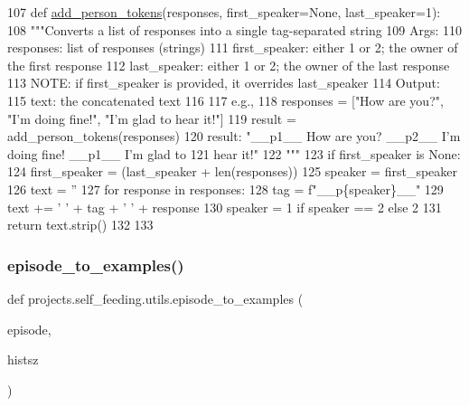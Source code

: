 \begin{DoxyCode}
107 \textcolor{keyword}{def }\hyperlink{namespaceprojects_1_1self__feeding_1_1utils_a3f3d055dc6c4058057baae7b240de5ec}{add\_person\_tokens}(responses, first\_speaker=None, last\_speaker=1):
108     \textcolor{stringliteral}{"""Converts a list of responses into a single tag-separated string}
109 \textcolor{stringliteral}{    Args:}
110 \textcolor{stringliteral}{        responses: list of responses (strings)}
111 \textcolor{stringliteral}{        first\_speaker: either 1 or 2; the owner of the first response}
112 \textcolor{stringliteral}{        last\_speaker: either 1 or 2; the owner of the last response}
113 \textcolor{stringliteral}{            NOTE: if first\_speaker is provided, it overrides last\_speaker}
114 \textcolor{stringliteral}{    Output:}
115 \textcolor{stringliteral}{        text: the concatenated text}
116 \textcolor{stringliteral}{}
117 \textcolor{stringliteral}{    e.g.,}
118 \textcolor{stringliteral}{    responses = ["How are you?", "I'm doing fine!", "I'm glad to hear it!"]}
119 \textcolor{stringliteral}{    result = add\_person\_tokens(responses)}
120 \textcolor{stringliteral}{    result: "\_\_p1\_\_ How are you? \_\_p2\_\_ I'm doing fine! \_\_p1\_\_ I'm glad to}
121 \textcolor{stringliteral}{        hear it!"}
122 \textcolor{stringliteral}{    """}
123     \textcolor{keywordflow}{if} first\_speaker \textcolor{keywordflow}{is} \textcolor{keywordtype}{None}:
124         first\_speaker = (last\_speaker + len(responses)) %
125     speaker = first\_speaker
126     text = \textcolor{stringliteral}{''}
127     \textcolor{keywordflow}{for} response \textcolor{keywordflow}{in} responses:
128         tag = f\textcolor{stringliteral}{"\_\_p\{speaker\}\_\_"}
129         text += \textcolor{stringliteral}{' '} + tag + \textcolor{stringliteral}{' '} + response
130         speaker = 1 \textcolor{keywordflow}{if} speaker == 2 \textcolor{keywordflow}{else} 2
131     \textcolor{keywordflow}{return} text.strip()
132 
133 
\end{DoxyCode}
\mbox{\label{namespaceprojects_1_1self__feeding_1_1utils_a4523d4a7c4da698dda134e32acebe320}} 
\subsubsection{\texorpdfstring{episode\+\_\+to\+\_\+examples()}{episode\_to\_examples()}}
{\footnotesize\ttfamily def projects.\+self\+\_\+feeding.\+utils.\+episode\+\_\+to\+\_\+examples (\begin{DoxyParamCaption}\item[{}]{episode,  }\item[{}]{histsz }\end{DoxyParamCaption})}

